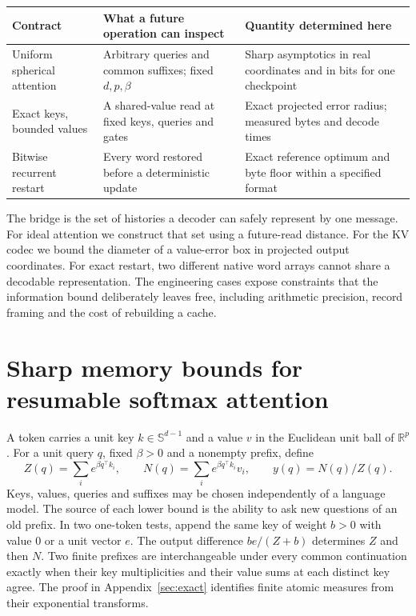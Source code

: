 \begin{center}
\small\begin{tabular}{@{}p{.25\linewidth}p{.35\linewidth}p{.31\linewidth}@{}}\toprule
Contract & What a future operation can inspect & Quantity determined here\\\midrule
Uniform spherical attention & Arbitrary queries and common suffixes; fixed $d,p,\beta$ & Sharp asymptotics in real coordinates and in bits for one checkpoint\\
Exact keys, bounded values & A shared-value read at fixed keys, queries and gates & Exact projected error radius; measured bytes and decode times\\
Bitwise recurrent restart & Every word restored before a deterministic update & Exact reference optimum and byte floor within a specified format\\\bottomrule
\end{tabular}
\end{center}

The bridge is the set of histories a decoder can safely represent by one message. For ideal attention we construct that set using a future-read distance. For the KV codec we bound the diameter of a value-error box in projected output coordinates. For exact restart, two different native word arrays cannot share a decodable representation. The engineering cases expose constraints that the information bound deliberately leaves free, including arithmetic precision, record framing and the cost of rebuilding a cache.

\section{Sharp memory bounds for resumable softmax attention}\label{sec:setup}
A token carries a unit key $k\in\mathbb S^{d-1}$ and a value $v$ in the Euclidean unit ball of $\mathbb R^p$. For a unit query $q$, fixed $\beta>0$ and a nonempty prefix, define
\[
 Z(q)=\sum_i e^{\beta q^\top k_i},\qquad N(q)=\sum_i e^{\beta q^\top k_i}v_i,\qquad y(q)=N(q)/Z(q).
\]
Keys, values, queries and suffixes may be chosen independently of a language model. The source of each lower bound is the ability to ask new questions of an old prefix. In two one-token tests, append the same key of weight $b>0$ with value $0$ or a unit vector $e$. The output difference $be/(Z+b)$ determines $Z$ and then $N$. Two finite prefixes are interchangeable under every common continuation exactly when their key multiplicities and their value sums at each distinct key agree. The proof in Appendix~\ref{sec:exact} identifies finite atomic measures from their exponential transforms.

